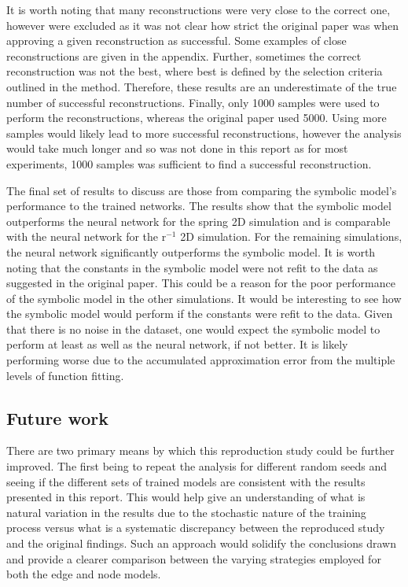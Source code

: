 \documentclass[11pt]{article}
\begin{document}
It is worth noting that many reconstructions were very close to the correct one, however were excluded as it was not clear how strict the original paper was when approving a given reconstruction as successful. Some examples of close reconstructions are given in the appendix. Further, sometimes the correct reconstruction was not the best, where best is defined by the selection criteria outlined in the method. Therefore, these results are an underestimate of the true number of successful reconstructions. Finally, only 1000 samples were used to perform the reconstructions, whereas the original paper used 5000. Using more samples would likely lead to more successful reconstructions, however the analysis would take much longer and so was not done in this report as for most experiments, 1000 samples was sufficient to find a successful reconstruction.

The final set of results to discuss are those from comparing the symbolic model's performance to the trained networks. The results show that the symbolic model outperforms the neural network for the spring 2D simulation and is comparable with the neural network for the r$^{-1}$ 2D simulation. For the remaining simulations, the neural network significantly outperforms the symbolic model. It is worth noting that the constants in the symbolic model were not refit to the data as suggested in the original paper. This could be a reason for the poor performance of the symbolic model in the other simulations. It would be interesting to see how the symbolic model would perform if the constants were refit to the data. Given that there is no noise in the dataset, one would expect the symbolic model to perform at least as well as the neural network, if not better. It is likely performing worse due to the accumulated approximation error from the multiple levels of function fitting.

\subsection{Future work}
    There are two primary means by which this reproduction study could be further improved. The first being to repeat the analysis for different random seeds and seeing if the different sets of trained models are consistent with the results presented in this report. This would help give an understanding of what is natural variation in the results due to the stochastic nature of the training process versus what is a systematic discrepancy between the reproduced study and the original findings. Such an approach would solidify the conclusions drawn and provide a clearer comparison between the varying strategies employed for both the edge and node models.
\end{document}
